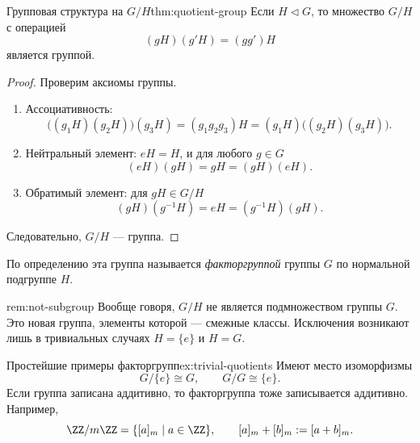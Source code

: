 \begin{Theorem}{Групповая структура на $G/H$}{thm:quotient-group}
	Если $H \triangleleft G$, то множество $G/H$ с операцией
	\[
	(gH)(g'H)=(gg')H
	\]
	является группой.
\end{Theorem}

\begin{proof}
	Проверим аксиомы группы.
	\begin{enumerate}
		\item Ассоциативность:
		\[
		\bigl((g_1H)(g_2H)\bigr)(g_3H) = (g_1g_2g_3)H = (g_1H)\bigl((g_2H)(g_3H)\bigr).
		\]
		\item Нейтральный элемент: $eH=H$, и для любого $g\in G$
		\[
		(eH)(gH)=gH=(gH)(eH).
		\]
		\item Обратимый элемент: для $gH\in G/H$
		\[
		(gH)(g^{-1}H)=eH=(g^{-1}H)(gH).
		\]
	\end{enumerate}
	Следовательно, $G/H$ --- группа.
\end{proof}

По определению эта группа называется \emph{факторгруппой} группы $G$ по нормальной подгруппе $H$.

\begin{Remark}{}{rem:not-subgroup}
	Вообще говоря, $G/H$ не является подмножеством группы $G$. Это новая группа, элементы которой --- смежные классы. Исключения возникают лишь в тривиальных случаях $H=\{e\}$ и $H=G$.
\end{Remark}

\begin{Example}{Простейшие примеры факторгрупп}{ex:trivial-quotients}
	Имеют место изоморфизмы
	\[
	G/\{e\} \cong G, \qquad G/G \cong \{e\}.
	\]
	Если группа записана аддитивно, то факторгруппа тоже записывается аддитивно. Например,
	\[
	\ZZ/m\ZZ = \{[a]_m \mid a\in \ZZ\}, \qquad [a]_m + [b]_m := [a+b]_m.
	\]
\end{Example}
